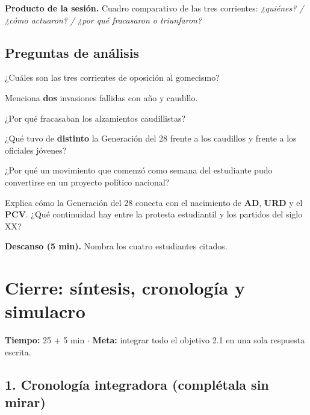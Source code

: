 \documentclass[12pt, letterpaper]{article}
\makeatletter
\let\mw@oldsection\section
\newcommand{\mw@prepage}{%
  \par
  \ifdim\pagegoal=\maxdimen\else
    \ifdim\dimexpr\pagegoal-\pagetotal\relax<7cm\relax
      \newpage
    \fi
  \fi}
\renewcommand{\section}{\mw@prepage\mw@oldsection}
\newcommand{\metasesion}[2]{%
  \begin{cabecerasesion}
    \small
    \textbf{\color{mwprimario}Tiempo:} #1 \quad$\cdot$\quad
    \textbf{\color{mwprimario}Meta:} #2
  \end{cabecerasesion}%
}
\newcommand{\pausa}[1]{%
  \begin{descanso}
    \small\textbf{\color{mwnaranja}Descanso (5 min).} #1
  \end{descanso}%
}
\makeatother
\begin{document}
\begin{cuadropasos}
  \small
  \textbf{Producto de la sesión.} Cuadro comparativo de las tres corrientes:
  \textit{¿quiénes? / ¿cómo actuaron? / ¿por qué fracasaron o triunfaron?}
\end{cuadropasos}

\subsection*{Preguntas de análisis}
\begin{preguntas}
  \item \facil{} ¿Cuáles son las tres corrientes de oposición al gomecismo?
  \item \facil{} Menciona \textbf{dos} invasiones fallidas con año y caudillo.
  \item \medio{} ¿Por qué fracasaban los alzamientos caudillistas?
  \item \dificil{} ¿Qué tuvo de \textbf{distinto} la Generación del 28 frente a los
        caudillos y frente a los oficiales jóvenes?
  \item \dificil{} ¿Por qué un movimiento que comenzó como \guillemotleft semana
        del estudiante\guillemotright{} pudo convertirse en un proyecto político
        nacional?
  \item \muyDificil{} Explica cómo la Generación del 28 conecta con el nacimiento de
        \textbf{AD}, \textbf{URD} y el \textbf{PCV}. ¿Qué continuidad hay entre
        la protesta estudiantil y los partidos del siglo XX?
\end{preguntas}

\pausa{Nombra los cuatro estudiantes citados.}

\section{Cierre: síntesis, cronología y simulacro}

\metasesion{25 + 5 min}{integrar todo el objetivo 2.1 en una sola respuesta
escrita.}

\subsection*{1. Cronología integradora (complétala sin mirar)}
\end{document}
